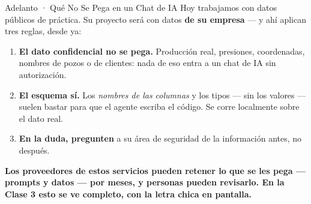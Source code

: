 \documentclass[aspectratio=169, 11pt]{beamer}
\begin{document}
\begin{frame}[shrink=5]{Adelanto · Qué No Se Pega en un Chat de IA}
  \vspace{2pt}
  {\scriptsize\color{textMuted}
   Hoy trabajamos con datos públicos de práctica. Su proyecto será con datos
   \textbf{de su empresa} --- y ahí aplican tres reglas, desde ya:}
  \vspace{2pt}
  {\scriptsize\color{textMuted}
  \begin{enumerate}\setlength{\itemsep}{3pt}
    \item[{\color{arcaRed}\scriptsize\faLock}]
      \textbf{El dato confidencial no se pega.} Producción real, presiones,
      coordenadas, nombres de pozos o de clientes: nada de eso entra a un
      chat de IA sin autorización.
    \item[{\color{codeGreen}\scriptsize\faCheck}]
      \textbf{El esquema sí.} Los \emph{nombres de las columnas} y los tipos
      --- sin los valores --- suelen bastar para que el agente escriba el
      código. Se corre localmente sobre el dato real.
    \item[{\color{arcaRed}\scriptsize\faQuestion}]
      \textbf{En la duda, pregunten} a su área de seguridad de la
      información antes, no después.
  \end{enumerate}}
  \vspace{2pt}
  \begin{tcolorbox}[colback=arcaGray, colframe=arcaDark, boxrule=0pt,
    leftrule=3pt, arc=3pt, left=8pt, right=8pt, top=4pt, bottom=4pt]
    {\scriptsize\color{arcaDark}\bfseries
     Los proveedores de estos servicios pueden retener lo que se les pega
     --- prompts y datos --- por meses, y personas pueden revisarlo. En la
     Clase 3 esto se ve completo, con la letra chica en pantalla.}
  \end{tcolorbox}
\end{frame}
\end{document}
